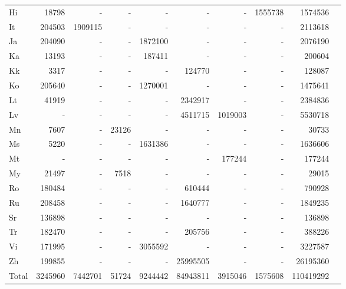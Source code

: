 \documentclass[11pt,a4paper]{article}
\begin{document}
\begin{table*}[htb]
\begin{tabular}{lrrrrrrrrr}
Hi   & 18798  & -        & -      & -             & -        & -         & 1555738                    & 1574536   \\ 
It   & 204503 & 1909115  & -      & -             & -        & -         &       -                     & 2113618   \\ 
Ja   & 204090 & -        & -      & 1872100       & -        & -         &         -                   & 2076190   \\ 
Ka   & 13193  & -        & -      & 187411        & -        & -         &        -                    & 200604    \\ 
Kk   & 3317   & -        & -      & -             & 124770   & -         &         -                   & 128087    \\ 
Ko   & 205640 & -        & -      & 1270001       & -        & -         &         -                   & 1475641   \\ 
Lt   & 41919  & -        & -      & -             & 2342917  & -         &        -                    & 2384836   \\ 
Lv   & -      & -        & -      & -             & 4511715  & 1019003   &        -                    & 5530718   \\ 
Mn   & 7607   & -        & 23126  & -             & -        & -         &         -                   & 30733     \\ 
Ms   & 5220   & -        & -      & 1631386       & -        & -         &        -                    & 1636606   \\ 
Mt   & -      & -        & -      & -             & -        & 177244    &        -                    & 177244    \\ 
My   & 21497  & -        & 7518   & -             & -        & -         &        -                    & 29015     \\ 
Ro   & 180484 & -        & -      & -             & 610444   & -         &          -                  & 790928    \\ 
Ru   & 208458 & -        & -      & -             & 1640777  & -         &          -                  & 1849235   \\ 
Sr   & 136898 & -        & -      & -             & -        & -         &          -                 & 136898    \\ 
Tr   & 182470 & -        & -      & -             & 205756   & -         &          -                  & 388226    \\ 
Vi   & 171995 & -        & -      & 3055592       & -        & -         &         -                  & 3227587   \\ 
Zh   & 199855 & -        & -      & -             & 25995505 & -         &        -                    & 26195360  \\
Total   & 3245960 & 7442701        & 51724      & 9244442             & 84943811 & 3915046         &    1575608      & 110419292  \\
\bottomrule


\end{tabular}
\end{table*}
\end{document}

